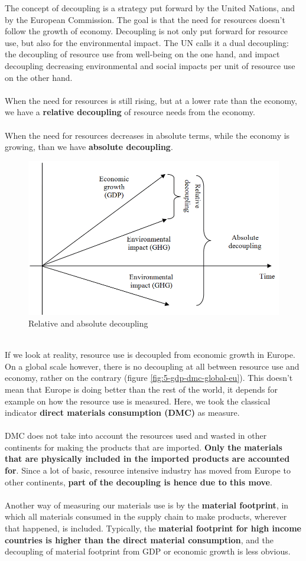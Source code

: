 \documentclass[../summary.tex]{subfiles}
\begin{document}
	The concept of decoupling is a strategy put forward by the United Nations, and by the European Commission. The goal is that the need for resources doesn’t follow the growth of economy. Decoupling is not only put forward for resource use, but also for the environmental impact. The UN calls it a dual decoupling: the decoupling of resource use from well-being on the one hand, and impact decoupling decreasing environmental and social impacts per unit of resource use on the other hand.
	\\\\
	When the need for resources is still rising, but at a lower rate than the economy, we have a \textbf{relative decoupling} of resource needs from the economy.
	\\\\
	When the need for resources decreases in absolute terms, while the economy is growing, than we have \textbf{absolute decoupling}.
	
	\begin{figure}[H]
		\centering
		\includegraphics[width=0.6\linewidth]{../images/5-relative-and-absolute-decoupling}
		\caption{Relative and absolute decoupling}
		\label{fig:5-relative-and-absolute-decoupling}
	\end{figure}
	
	\ \\
	If we look at reality, resource use is decoupled from economic growth in Europe. On a global scale however, there is no decoupling at all between resource use and economy, rather on the contrary (figure \ref{fig:5-gdp-dmc-global-eu}). This doesn't mean that Europe is doing better than the rest of the world, it depends for example on how the resource use is measured. Here, we took the classical indicator \textbf{direct materials consumption (DMC)} as measure.
	\\
	\\
	DMC does not take into account the resources used and wasted in other continents for making the products that are imported. \textbf{Only the materials that are physically included in the imported products are accounted for}. Since a lot of basic, resource intensive industry has moved from Europe to other continents, \textbf{part of the decoupling is hence due to this move}. 
	\\
	\\
	Another way of measuring our materials use is by the \textbf{material footprint}, in which all materials consumed in the supply chain to make products, wherever that happened, is included. Typically, the \textbf{material footprint for high income countries is higher than the direct material consumption}, and the decoupling of material footprint from GDP or economic growth is less obvious.
	
\end{document}
